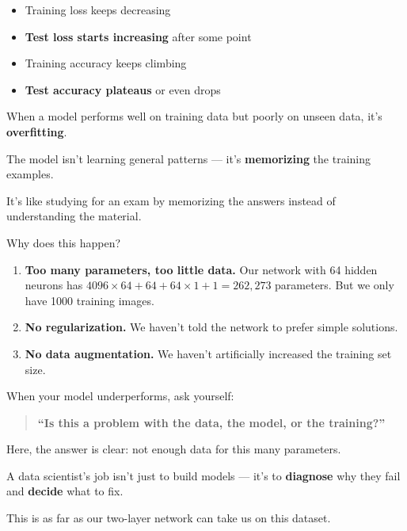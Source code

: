\documentclass[11pt]{article}
\begin{document}
\begin{itemize}
  \item Training loss keeps decreasing
  \item \textbf{Test loss starts increasing} after some point
  \item Training accuracy keeps climbing
  \item \textbf{Test accuracy plateaus} or even drops
\end{itemize}

\begin{warnbox}[title=Overfitting]
When a model performs well on training data but poorly on unseen data, it's \textbf{overfitting}.

The model isn't learning general patterns --- it's \textbf{memorizing} the training examples.

It's like studying for an exam by memorizing the answers instead of understanding the material.
\end{warnbox}

Why does this happen?

\begin{enumerate}
  \item \textbf{Too many parameters, too little data.}
  Our network with 64 hidden neurons has $4096 \times 64 + 64 + 64 \times 1 + 1 = 262{,}273$ parameters.
  But we only have 1000 training images.

  \item \textbf{No regularization.}
  We haven't told the network to prefer simple solutions.

  \item \textbf{No data augmentation.}
  We haven't artificially increased the training set size.
\end{enumerate}

\begin{insightbox}[title=The Million-Dollar Question]
When your model underperforms, ask yourself:

\begin{quote}
\textbf{``Is this a problem with the data, the model, or the training?''}
\end{quote}

Here, the answer is clear: not enough data for this many parameters.

A data scientist's job isn't just to build models --- it's to \textbf{diagnose} why they fail and \textbf{decide} what to fix.
\end{insightbox}

This is as far as our two-layer network can take us on this dataset.
\end{document}
